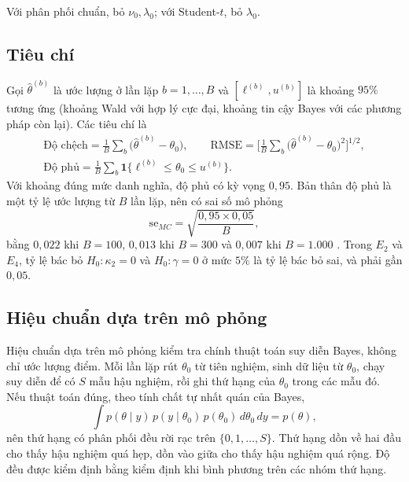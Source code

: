 \documentclass[12pt,a4paper]{article}
\theoremstyle{definition}
\theoremstyle{remark}
\newcommand{\ind}{\mathbf{1}}
\begin{document}
Với phân phối chuẩn, bỏ $\nu_0,\lambda_0$; với Student-$t$, bỏ $\lambda_0$.

\subsection{Tiêu chí}

Gọi $\hat\theta^{(b)}$ là ước lượng ở lần lặp $b=1,\dots,B$ và $[\ell^{(b)},u^{(b)}]$ là khoảng $95\%$ tương ứng (khoảng Wald với hợp lý cực đại, khoảng tin cậy Bayes với các phương pháp còn lại). Các tiêu chí là
\begin{gather}
\text{Độ chệch}=\frac1B\sum_b\big(\hat\theta^{(b)}-\theta_0\big),\qquad
\text{RMSE}=\Big[\frac1B\sum_b\big(\hat\theta^{(b)}-\theta_0\big)^2\Big]^{1/2},\\
\text{Độ phủ}=\frac1B\sum_b\ind\big\{\ell^{(b)}\le\theta_0\le u^{(b)}\big\}.
\end{gather}
Với khoảng đúng mức danh nghĩa, độ phủ có kỳ vọng $0{,}95$. Bản thân độ phủ là một tỷ lệ ước lượng từ $B$ lần lặp, nên có sai số mô phỏng
\begin{equation}
\mathrm{se}_{MC}=\sqrt{\frac{0{,}95\times0{,}05}{B}},
\end{equation}
bằng $0{,}022$ khi $B=100$, $0{,}013$ khi $B=300$ và $0{,}007$ khi $B=1.000$ \cite{morris2019}. Trong $E_2$ và $E_4$, tỷ lệ bác bỏ $H_0:\kappa_2=0$ và $H_0:\gamma=0$ ở mức $5\%$ là tỷ lệ bác bỏ sai, và phải gần $0{,}05$.

\subsection{Hiệu chuẩn dựa trên mô phỏng}

Hiệu chuẩn dựa trên mô phỏng \cite{talts2018} kiểm tra chính thuật toán suy diễn Bayes, không chỉ ước lượng điểm. Mỗi lần lặp rút $\theta_0$ từ tiên nghiệm, sinh dữ liệu từ $\theta_0$, chạy suy diễn để có $S$ mẫu hậu nghiệm, rồi ghi thứ hạng của $\theta_0$ trong các mẫu đó. Nếu thuật toán đúng, theo tính chất tự nhất quán của Bayes,
\begin{equation}
\int p(\theta\mid y)\,p(y\mid\theta_0)\,p(\theta_0)\,d\theta_0\,dy=p(\theta),
\end{equation}
nên thứ hạng có phân phối đều rời rạc trên $\{0,1,\dots,S\}$. Thứ hạng dồn về hai đầu cho thấy hậu nghiệm quá hẹp, dồn vào giữa cho thấy hậu nghiệm quá rộng. Độ đều được kiểm định bằng kiểm định khi bình phương trên các nhóm thứ hạng.

\end{document}
